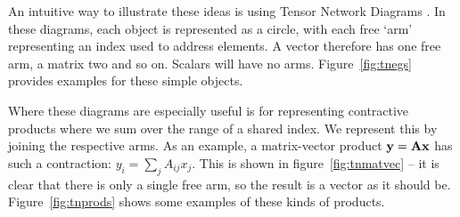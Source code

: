 An intuitive way to illustrate these ideas is using Tensor Network Diagrams
\autocite{Cichocki2016, Orus2014}. In these diagrams, each object is represented
as a circle, with each free `arm' representing an index used to address elements.
A vector therefore has one free arm, a matrix two and so on. Scalars will have
no arms. Figure~\ref{fig:tnegs} provides examples for these simple objects. 

Where these diagrams are especially useful is for representing contractive products
where we sum over the range of a shared index. We represent this by joining the
respective arms. As an example, a matrix-vector product \(\mathbf{y} = \mathbf{Ax}\)
has such a contraction: \(y_{i} = \sum_{j}A_{ij}x_{j}\). This is shown in
figure~\ref{fig:tnmatvec} -- it is clear that there is only a single free arm, so the
result is a vector as it should be. Figure~\ref{fig:tnprods} shows some examples
of these kinds of products.

